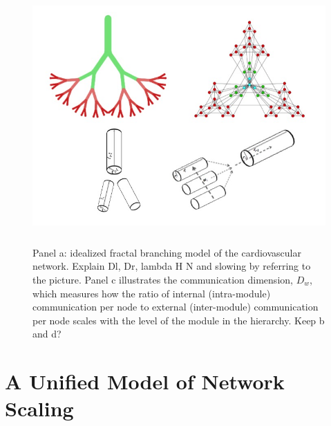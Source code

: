 \documentclass[12pt]{article}
\begin{document}
\begin{figure}[!h]
\centering
\includegraphics[height=90mm]{Figures/Figure1Draft.jpg}
\label{fig:firstfig}
\caption{Panel a: idealized fractal branching model of the cardiovascular network. Explain Dl, Dr, lambda H N and slowing by referring to the picture. 
Panel c illustrates the communication dimension, $D_w$,
  which measures how the ratio of internal (intra-module) communication per node to
  external (inter-module) communication per node scales with the level of the module in
  the hierarchy. Keep b and d? }
\end{figure}


\section{A Unified Model of Network Scaling}
\label{sec:unified-model}
\end{document}

